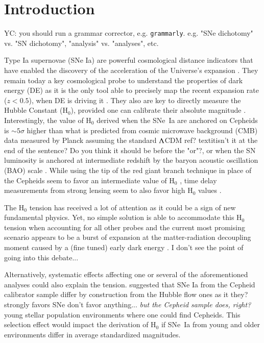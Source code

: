 \documentclass[]{aa} %
\newcommand{\nn}[1]{{\textcolor[rgb]{0.25, 0.50, 0}{#1}}}
\newcommand{\yc}[1]{{\textcolor{BrickRed}{#1}}}
\begin{document}
\section{Introduction}

\yc{YC: you should run a grammar corrector, e.g. \texttt{grammarly}. e.g. "SNe dichotomy" vs. "SN dichotomy", "analysis" vs. "analyses", etc.}

Type Ia supernovae (SNe Ia) are powerful cosmological distance indicators that
have enabled the discovery of the acceleration of the Universe's expansion
\citep{riess1998, perlmutter1999}. They remain today a key cosmological probe to
understand the properties of dark energy (DE) as it is the only tool able to
precisely map the recent expansion rate ($z<0.5$), when DE is driving it
\citep[e.g.][]{scolnicastro2020}. They also are key to directly measure the
Hubble Constant (H$_0$), provided one can calibrate their absolute magnitude
\citep{riess2016, freedman2019}. Interestingly, the value of H$_0$ derived when
the SNe~Ia are anchored on Cepheids \citep[the SH0ES
project,][]{riess2009,riess2016} is $\sim5\sigma$ higher than what is predicted
\yc{from} cosmic microwave background (CMB) data measured by Planck assuming the
standard $\Lambda$CDM \yc{ref?} \nn{textit{isn't it at the end of the sentence? Do you think it should be before the "or"?}}, or when the SN luminosity is anchored at intermediate
redshift by the baryon acoustic oscillation (BAO) scale
\citep{riess2019,reid2019,planck2018, feeney2019}. While using the tip of the
red giant branch technique in place of the Cepheids seem to favor an
intermediate value of H$_0$ \citep{freedman2019,freedman2020}, time delay
measurements from strong lensing seem to also favor high H$_0$ values
\citep{wong2019}.

The H$_0$ tension has received a lot of attention as it could be a sign of new
fundamental physics. Yet, no simple solution is able to accommodate this H$_0$
tension when accounting for all other probes \citep{knox2019} and the current
most promising scenario appears to be a burst of expansion at the
matter-radiation decoupling moment caused by a (fine tuned) early dark energy
\citep{poulin2019}. \yc{I don't see the point of going into this debate...}

Alternatively, systematic effects affecting one or several of the aforementioned
analyses could also explain the tension. \cite{rigault2015} suggested
that SNe Ia from the Cepheid calibrator sample differ by construction from the
Hubble flow \yc{ones} as it \yc{they?} strongly favors \yc{SNe don't favor anything...} \nn{\textit{but the Cepheid sample does, right?}} young stellar population environments where
one could find Cepheids. This selection effect would impact the derivation of
H$_0$ if SNe~Ia from young and older environments differ in average \yc{standardized} magnitudes. 
\end{document}
